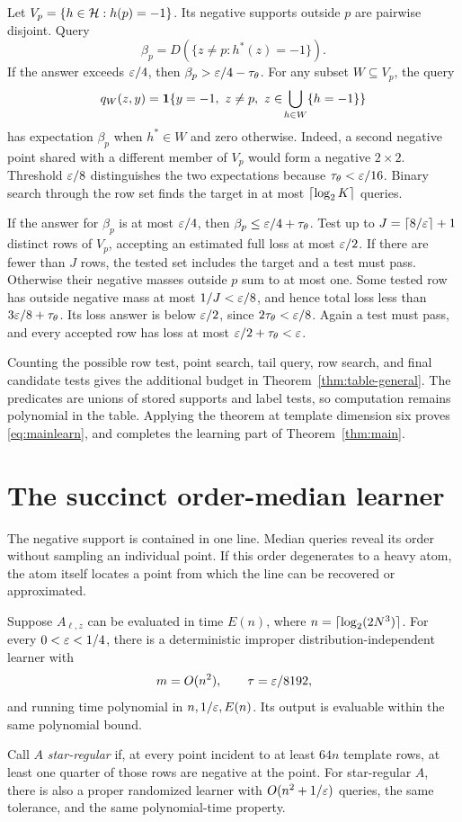 Let $V_p=\{h\in\mathcal H:h(p)=-1\}$. Its negative supports outside $p$ are pairwise disjoint. Query
\[
 \beta_p=D(\{z\ne p:h^*(z)=-1\}).
\]
If the answer exceeds $\varepsilon/4$, then $\beta_p>\varepsilon/4-\tau_\theta$. For any subset $W\subseteq V_p$, the query
\[
 q_W(z,y)=\one\{y=-1,\ z\ne p,\ z\in\!\bigcup_{h\in W}\{h=-1\}\}
\]
has expectation $\beta_p$ when $h^*\in W$ and zero otherwise. Indeed, a second negative point shared with a different member of $V_p$ would form a negative $2\times2$. Threshold $\varepsilon/8$ distinguishes the two expectations because $\tau_\theta<\varepsilon/16$. Binary search through the row set finds the target in at most $\lceil \log_2K\rceil$ queries.

If the answer for $\beta_p$ is at most $\varepsilon/4$, then $\beta_p\le\varepsilon/4+\tau_\theta$. Test up to $J=\lceil 8/\varepsilon\rceil+1$ distinct rows of $V_p$, accepting an estimated full loss at most $\varepsilon/2$. If there are fewer than $J$ rows, the tested set includes the target and a test must pass. Otherwise their negative masses outside $p$ sum to at most one. Some tested row has outside negative mass at most $1/J<\varepsilon/8$, and hence total loss less than $3\varepsilon/8+\tau_\theta$. Its loss answer is below $\varepsilon/2$, since $2\tau_\theta<\varepsilon/8$. Again a test must pass, and every accepted row has loss at most $\varepsilon/2+\tau_\theta<\varepsilon$.

Counting the possible row test, point search, tail query, row search, and final candidate tests gives the additional budget in Theorem~\ref{thm:table-general}. The predicates are unions of stored supports and label tests, so computation remains polynomial in the table. Applying the theorem at template dimension six proves \eqref{eq:mainlearn}, and completes the learning part of Theorem~\ref{thm:main}.

\section{The succinct order-median learner}
\label{app:median}
The negative support is contained in one line. Median queries reveal its order without sampling an individual point. If this order degenerates to a heavy atom, the atom itself locates a point from which the line can be recovered or approximated.

\begin{theorem}
\label{thm:median}
Suppose $A_{\ell,z}$ can be evaluated in time $E(n)$, where $n=\lceil \log_2(2N^3)\rceil$. For every $0<\varepsilon<1/4$, there is a deterministic improper distribution-independent learner with
\begin{equation}
 m=O(n^2),\qquad \tau=\varepsilon/8192,
\label{eq:medianparams}
\end{equation}
and running time polynomial in $n,1/\varepsilon,E(n)$. Its output is evaluable within the same polynomial bound.

Call $A$ \emph{star-regular} if, at every point incident to at least $64n$ template rows, at least one quarter of those rows are negative at the point. For star-regular $A$, there is also a proper randomized learner with $O(n^2+1/\varepsilon)$ queries, the same tolerance, and the same polynomial-time property.
\end{theorem}

